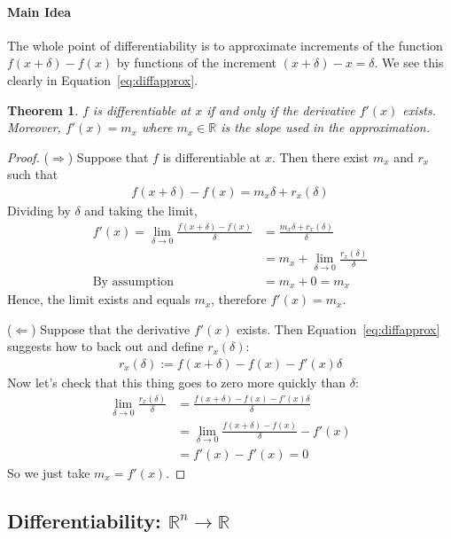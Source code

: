 \documentclass[12pt]{article}
\numberwithin{equation}{section} %
\theoremstyle{plain}
\newtheorem{thm}{Theorem}[section]
\theoremstyle{definition}
\theoremstyle{remark}
\newcommand{\R}{\mathbb{R}}
\newcommand{\Rn}{\mathbb{R}^n}
\begin{document}
\paragraph{Main Idea} The whole point of differentiability is to
approximate increments of the function $f(x+\delta)-f(x)$ by functions
of the increment $(x+\delta)-x=\delta$. We see this clearly in
Equation~\ref{eq:diffapprox}.

\begin{thm}
$f$ is differentiable at $x$ if and only if the derivative $f'(x)$
exists. Moreover, $f'(x)=m_x$ where $m_x\in\R$ is the slope used in the
approximation.
\end{thm}
\begin{proof}
($\Rightarrow$) Suppose that $f$ is differentiable at $x$. Then there
exist $m_x$ and $r_x$ such that
\begin{align*}
  f(x+\delta)-f(x) = m_x\delta + r_x(\delta)
\end{align*}
Dividing by $\delta$ and taking the limit,
\begin{align*}
  f'(x)=\lim_{\delta\rightarrow 0}
  \frac{f(x+\delta)-f(x)}{\delta}
  &= \frac{m_x\delta + r_x(\delta)}{\delta}\\
  &= m_x + \lim_{\delta\rightarrow 0} \frac{r_x(\delta)}{\delta}\\
  \text{By assumption}\quad
  &= m_x + 0 = m_x
\end{align*}
Hence, the limit exists and equals $m_x$, therefore $f'(x)=m_x$.


($\Leftarrow$) Suppose that the derivative $f'(x)$ exists.  Then
Equation~\ref{eq:diffapprox} suggests how to back out and define
$r_x(\delta)$:
\begin{align*}
  r_x(\delta) := f(x+\delta)-f(x) - f'(x)\delta
\end{align*}
Now let's check that this thing goes to zero more quickly than $\delta$:
\begin{align*}
  \lim_{\delta\rightarrow 0}
  \frac{r_x(\delta)}{\delta}
  &=
  \frac{f(x+\delta)-f(x) - f'(x)\delta}{\delta}\\
  &=
  \lim_{\delta\rightarrow 0}
  \frac{f(x+\delta)-f(x)}{\delta}
  -f'(x) \\
  &= f'(x) -f'(x)=0
\end{align*}
So we just take $m_x=f'(x)$.
\end{proof}

\subsection{Differentiability: $\Rn\rightarrow\R$}
\end{document}

